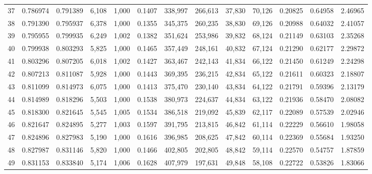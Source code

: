 \begin{tabular}{rrrrrrrrrrrrr}
37  &  0.786974 &  0.791389 &   6,108 &  1,000 &                                     0.1407 &  338,997 &  266,613 &   37,830 &   70,126 &  0.20825 &  0.64958 &  2.46965 \\
38  &  0.791390 &  0.795937 &   6,378 &  1,000 &                                     0.1355 &  345,375 &  260,235 &   38,830 &   69,126 &  0.20988 &  0.64032 &  2.41057 \\
39  &  0.795955 &  0.799935 &   6,249 &  1,002 &                                     0.1382 &  351,624 &  253,986 &   39,832 &   68,124 &  0.21149 &  0.63103 &  2.35268 \\
40  &  0.799938 &  0.803293 &   5,825 &  1,000 &                                     0.1465 &  357,449 &  248,161 &   40,832 &   67,124 &  0.21290 &  0.62177 &  2.29872 \\
41  &  0.803296 &  0.807205 &   6,018 &  1,002 &                                     0.1427 &  363,467 &  242,143 &   41,834 &   66,122 &  0.21450 &  0.61249 &  2.24298 \\
42  &  0.807213 &  0.811087 &   5,928 &  1,000 &                                     0.1443 &  369,395 &  236,215 &   42,834 &   65,122 &  0.21611 &  0.60323 &  2.18807 \\
43  &  0.811099 &  0.814973 &   6,075 &  1,000 &                                     0.1413 &  375,470 &  230,140 &   43,834 &   64,122 &  0.21791 &  0.59396 &  2.13179 \\
44  &  0.814989 &  0.818296 &   5,503 &  1,000 &                                     0.1538 &  380,973 &  224,637 &   44,834 &   63,122 &  0.21936 &  0.58470 &  2.08082 \\
45  &  0.818300 &  0.821645 &   5,545 &  1,005 &                                     0.1534 &  386,518 &  219,092 &   45,839 &   62,117 &  0.22089 &  0.57539 &  2.02946 \\
46  &  0.821647 &  0.824895 &   5,277 &  1,003 &                                     0.1597 &  391,795 &  213,815 &   46,842 &   61,114 &  0.22229 &  0.56610 &  1.98058 \\
47  &  0.824896 &  0.827983 &   5,190 &  1,000 &                                     0.1616 &  396,985 &  208,625 &   47,842 &   60,114 &  0.22369 &  0.55684 &  1.93250 \\
48  &  0.827987 &  0.831146 &   5,820 &  1,000 &                                     0.1466 &  402,805 &  202,805 &   48,842 &   59,114 &  0.22570 &  0.54757 &  1.87859 \\
49  &  0.831153 &  0.833840 &   5,174 &  1,006 &                                     0.1628 &  407,979 &  197,631 &   49,848 &   58,108 &  0.22722 &  0.53826 &  1.83066 \\

\end{tabular}
